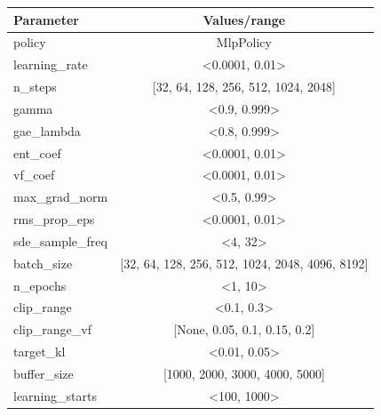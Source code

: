 \documentclass[../xlapes02]{subfiles}
\begin{document}
    \begin{center}
        \begin{tabular}{|l|c|}
            \hline
            \textbf{Parameter}        & \textbf{Values/range}                           \\ \hline
            policy                    & MlpPolicy                                       \\ \hline
            learning\_rate            & <0.0001, 0.01>                                  \\ \hline
            n\_steps                  & [32, 64, 128, 256, 512, 1024, 2048]             \\ \hline
            gamma                     & <0.9, 0.999>                                    \\ \hline
            gae\_lambda               & <0.8, 0.999>                                    \\ \hline
            ent\_coef                 & <0.0001, 0.01>                                  \\ \hline
            vf\_coef                  & <0.0001, 0.01>                                  \\ \hline
            max\_grad\_norm           & <0.5, 0.99>                                     \\ \hline
            rms\_prop\_eps            & <0.0001, 0.01>                                  \\ \hline
            sde\_sample\_freq         & <4, 32>                                         \\ \hline
            batch\_size               & [32, 64, 128, 256, 512, 1024, 2048, 4096, 8192] \\ \hline
            n\_epochs                 & <1, 10>                                         \\ \hline
            clip\_range               & <0.1, 0.3>                                      \\ \hline
            clip\_range\_vf           & [None, 0.05, 0.1, 0.15, 0.2]                    \\ \hline
            target\_kl                & <0.01, 0.05>                                    \\ \hline
            buffer\_size              & [1000, 2000, 3000, 4000, 5000]                  \\ \hline
            learning\_starts          & <100, 1000>                                     \\ \hline

\end{tabular}
\end{center}
\end{document}
